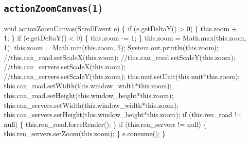 \subsection{\texttt{actionZoomCanvas}(1)}
\nwenddocs{}\endmoddef{}
void actionZoomCanvas(ScrollEvent e) \{
  if (e.getDeltaY() > 0) \{
    this.zoom += 1;
  \}
  if (e.getDeltaY() < 0) \{
    this.zoom -= 1;
  \}
  this.zoom = Math.max(this.zoom, 1);
  this.zoom = Math.min(this.zoom, 5);
  System.out.println(this.zoom);
  //this.can_road.setScaleX(this.zoom);
  //this.can_road.setScaleY(this.zoom);
  //this.can_servers.setScaleX(this.zoom);
  //this.can_servers.setScaleY(this.zoom);
  this.muf.setUnit(this.unit*this.zoom);
  this.can_road.setWidth(this.window_width*this.zoom);
  this.can_road.setHeight(this.window_height*this.zoom);
  this.can_servers.setWidth(this.window_width*this.zoom);
  this.can_servers.setHeight(this.window_height*this.zoom);
  if (this.ren_road != null) \{
    this.ren_road.forceRender();
  \}
  if (this.ren_servers != null) \{
    this.ren_servers.setZoom(this.zoom);
  \}
  e.consume();
\}
\eatline
{}\nwendcode{}\nwdocspar
